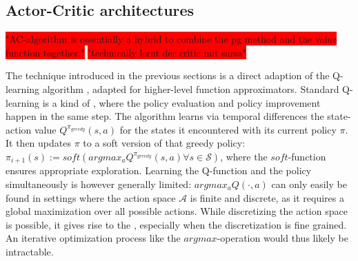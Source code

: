 \subsection{Actor-Critic architectures}

\colorbox{red}{"AC-algorithm is essentially a hybrid to combine the pg method and the value function together."}
\colorbox{red}{"technically lernt der critic mit sarsa"}


The technique introduced in the previous sections is a direct adaption of the Q-learning algorithm \cite{sutton_learning_1988}\cite{watkins_learning_1989}, adapted for higher-level function approximators. Standard Q-learning is a kind of , where the policy evaluation and policy improvement happen in the same step. The algorithm learns via temporal differences the state-action value $Q^{\pi_{greedy}}(s,a)$ for the states it encountered with its current policy $\pi$. It then updates $\pi$ to a soft version of that greedy policy: $\pi_{i+1}(s) := soft(argmax_a Q^{\pi_{greedy}}(s,a) \forall s \in \mathcal{S})$, where the $soft$-function ensures appropriate exploration. Learning the Q-function and the policy simultaneously is however generally limited: $argmax_aQ(\cdot, a)$ can only easily be found in settings where the action space $\mathcal{A}$ is finite and discrete, as it requires a global maximization over all possible actions. While discretizing the action space is possible, it gives rise to the , especially when the discretization is fine grained. An iterative optimization process like the $argmax$-operation would thus likely be intractable.\\



